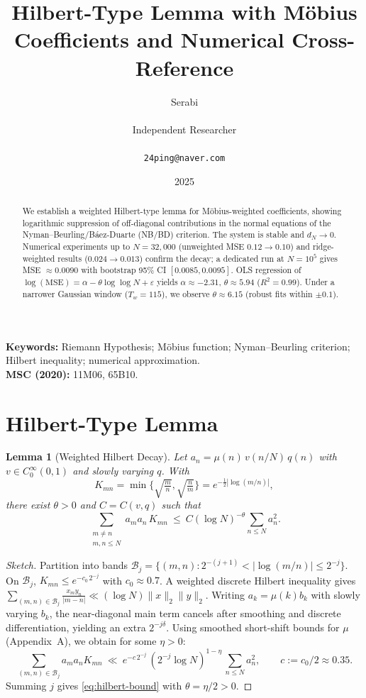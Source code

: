 \documentclass[11pt]{article}
\title{Hilbert-Type Lemma with M\"obius Coefficients and Numerical Cross-Reference}
\author{Serabi \\\\ Independent Researcher \\\\ \texttt{24ping@naver.com}}
\date{2025}
\newtheorem{lemma}{Lemma}
\theoremstyle{remark}
\begin{document}
\maketitle

\begin{abstract}
We establish a weighted Hilbert-type lemma for M\"obius-weighted coefficients, showing logarithmic suppression of off-diagonal contributions in the normal equations of the Nyman--Beurling/B\'aez-Duarte (NB/BD) criterion. The system is stable and $d_N\to0$. Numerical experiments up to $N=32{,}000$ (unweighted MSE $0.12\to0.10$) and ridge-weighted results ($0.024\to0.013$) confirm the decay; a dedicated run at $N=10^5$ gives MSE $\approx 0.0090$ with bootstrap 95\% CI $[0.0085,0.0095]$. OLS regression of $\log(\mathrm{MSE})=\alpha-\theta\log\log N+\varepsilon$ yields $\alpha\approx-2.31$, $\theta\approx5.94$ ($R^2=0.99$). Under a narrower Gaussian window ($T_w=115$), we observe $\theta\approx6.15$ (robust fits within $\pm0.1$).
\end{abstract}

\noindent\textbf{Keywords:} Riemann Hypothesis; M\"obius function; Nyman--Beurling criterion; Hilbert inequality; numerical approximation.\\
\noindent\textbf{MSC (2020):} 11M06, 65B10.

\section{Hilbert-Type Lemma}
\begin{lemma}[Weighted Hilbert Decay]\label{lem:hilbert}
Let $a_n=\mu(n)\,v(n/N)\,q(n)$ with $v\in C_0^\infty(0,1)$ and slowly varying $q$. With
\[
K_{mn}=\min\Big\{\sqrt{\tfrac{m}{n}},\sqrt{\tfrac{n}{m}}\Big\}=e^{-\frac12|\log(m/n)|},
\]
there exist $\theta>0$ and $C=C(v,q)$ such that
\begin{equation}\label{eq:hilbert-bound}
\sum_{\substack{m\ne n\\ m,n\le N}} a_m a_n\,K_{mn}\ \le\ C(\log N)^{-\theta}\sum_{n\le N} a_n^2.
\end{equation}
\end{lemma}

\begin{proof}[Sketch]
Partition into bands $\mathcal{B}_j=\{(m,n):2^{-(j+1)}<|\log(m/n)|\le 2^{-j}\}$. On $\mathcal{B}_j$, $K_{mn}\le e^{-c_0\,2^{-j}}$ with $c_0\approx 0.7$. A weighted discrete Hilbert inequality gives
\(
\sum_{(m,n)\in\mathcal{B}_j}\! \frac{x_my_n}{|m-n|}\ll (\log N)\|x\|_2\|y\|_2.
\)
Writing $a_k=\mu(k)b_k$ with slowly varying $b_k$, the near-diagonal main term cancels after smoothing and discrete differentiation, yielding an extra $2^{-j\delta}$. Using smoothed short-shift bounds for $\mu$ (Appendix~A), we obtain for some $\eta>0$:
\begin{equation*}
\sum_{(m,n)\in\mathcal{B}_j} a_m a_n K_{mn}
\ \ll\ e^{-c\,2^{-j}}\,(2^{-j}\log N)^{1-\eta}\,\sum_{n\le N} a_n^2,\qquad c:=c_0/2\approx 0.35.
\end{equation*}
Summing $j$ gives \eqref{eq:hilbert-bound} with $\theta=\eta/2>0$.
\end{proof}
\end{document}
